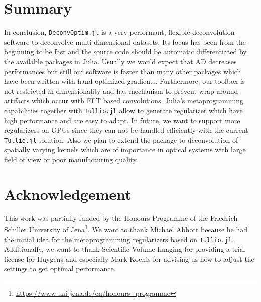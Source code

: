 \documentclass{juliacon}
\begin{document}
\section{Summary}
    In conclusion, \verb|DeconvOptim.jl| is a very performant, flexible deconvolution software to deconvolve multi-dimensional datasets.
    Its focus has been from the beginning to be fast and the source code should be automatic differentiated by the available
    packages in Julia. Usually we would expect that AD decreases performances but still our software is faster than
    many other packages which have been written with hand-optimized gradients.
    Furthermore, our toolbox is not restricted in dimensionality and has mechanism to prevent wrap-around artifacts which
    occur with FFT based convolutions.
    Julia's metaprogramming capabilities together with \verb|Tullio.jl| allow to generate regularizer which have high performance
    and are easy to adapt.
    In future, we want to support more regularizers on GPUs since they can not be handled efficiently with the current \verb|Tullio.jl| solution.
    Also we plan to extend the package to deconvolution of spatially varying kernels which are of importance in optical systems
    with large field of view or poor manufacturing quality.

\section{Acknowledgement}
    This work was partially funded by the Honours Programme of the Friedrich Schiller 
    University of Jena\footnote{\url{https://www.uni-jena.de/en/honours_programme}}.
    We want to thank Michael Abbott because he had the
    initial idea for the metaprogramming regularizers based on \verb|Tullio.jl|. 
    Additionally, we want to thank Scientific Volume Imaging for providing a trial license for Huygens and especially Mark Koenis for advising
    us how to adjust the settings to get optimal performance. 


\end{document}
